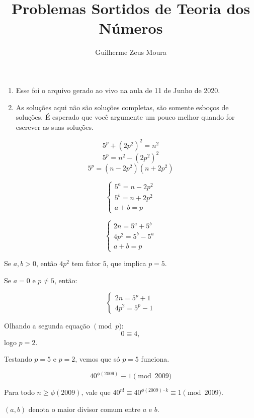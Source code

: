 \documentclass[10pt, a4paper]{article}
\title{Problemas Sortidos de Teoria dos Números}
\author{Guilherme Zeus Moura}
\begin{document}
	
	\zeustitle
	
	\begin{enumerate}[label = \textbullet]
		\item Esse foi o arquivo gerado ao vivo na aula de 11 de Junho de 2020.
		\item As soluções aqui não são soluções completas, são somente esboços de soluções.
			É esperado que você argumente um pouco melhor quando for escrever as suas soluções.
	\end{enumerate}

	\newpage
	\[5^p + (2p^2)^2 = n^2\]
	\[5^p = n^2 - (2p^2)^2\]
	\[5^p = (n - 2p^2)(n + 2p^2)\]
	
	\[\begin{cases} 5^a = n - 2p^2 \\ 5^b = n + 2p^2 \\ a + b = p \end{cases}\]

	\[\begin{cases} 2n = 5^a + 5^b \\ 4p^2 = 5^b - 5^a \\ a + b = p \end{cases}\]

	Se $a, b > 0$, então $4p^2$ tem fator $5$, que implica $p = 5$.

	Se $a = 0$ e $p \neq 5$, então:

	\[\begin{cases} 2n = 5^p + 1 \\ 4p^2 = 5^p - 1 \end{cases} \]

	Olhando a segunda equação $\pmod{p}$: \[ 0 \equiv 4, \] logo $p = 2$.

	Testando $p = 5$ e $p = 2$, vemos que só $p = 5$ funciona.
	
	\newpage
	

	\[ 40^{\phi(2009)} \equiv 1 \pmod{2009}\]

	Para todo $n \ge \phi(2009)$, vale que $40^{n!} \equiv 40^{\phi(2009) \cdot k} \equiv 1 \pmod{2009}$.

	\newpage

	\begin{defn}
		$(a, b)$ denota o maior divisor comum entre $a$ e $b$.
	\end{defn}
\end{document}
